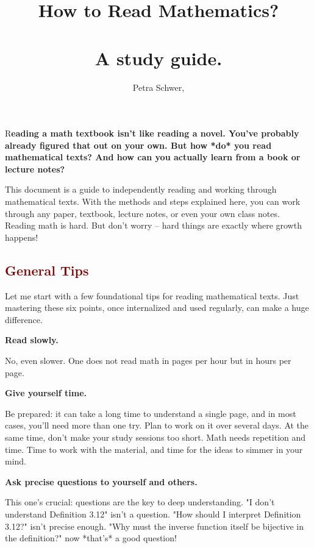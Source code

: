 \documentclass[paper=a4, fontsize=12pt]{scrartcl} %
\title{\Huge{How to Read Mathematics? }\\
\Large{{\ }\\ A study guide.
	}
} %
\author{Petra Schwer, }											%
\date{}																				%
\newcommand{\initial}[1]{%
\lettrine[lines=3,lhang=0.3,nindent=0em]{
\color{DarkGoldenrod}
{\textsf{#1}}}{}}
\begin{document}
\maketitle
\thispagestyle{fancy} 			%

\initial{R}\textbf{eading a math textbook isn't like reading a novel. You've probably already figured that out on your own. But how *do* you read mathematical texts? And how can you actually learn from a book or lecture notes?} 

This document is a guide to independently reading and working through mathematical texts.  
With the methods and steps explained here, you can work through any paper, textbook, lecture notes, or even your own class notes.  
Reading math is hard. But don’t worry -- hard things are exactly where growth happens!

\subsection*{\textcolor{Maroon}{General Tips}}

Let me start with a few foundational tips for reading mathematical texts. Just mastering these six points, once internalized and used regularly, can make a huge difference.

\bigskip

\noindent
\textbf{Read slowly.}

No, even slower. One does not read math in pages per hour but in hours per page.

\medskip
\noindent
\textbf{Give yourself time.}

Be prepared: it can take a long time to understand a single page, and in most cases, you’ll need more than one try. Plan to work on it over several days. At the same time, don’t make your study sessions too short. Math needs repetition and time. Time to work with the material, and time for the ideas to simmer in your mind.

\medskip
\noindent
\textbf{Ask precise questions to yourself and others.}

This one’s crucial: questions are the key to deep understanding.  
"I don’t understand Definition 3.12" isn’t a question.  
"How should I interpret Definition 3.12?" isn’t precise enough.  
"Why must the inverse function itself be bijective in the definition?" now *that’s* a good question!
\end{document}
